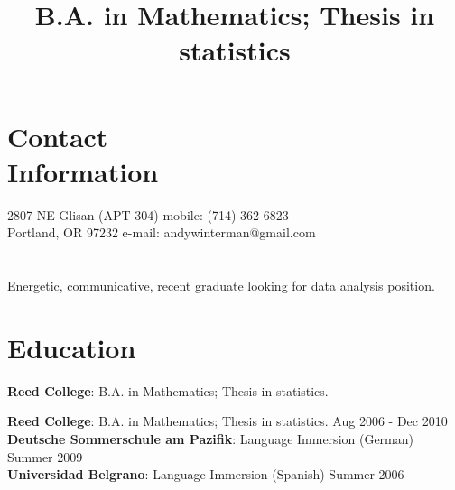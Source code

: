 \documentclass[margin,line]{resume}
\begin{document}
\begin{resume}

    \section{\mysidestyle Contact\\Information}


   2807 NE Glisan (APT 304)                    \hfill  mobile: (714) 362-6823          \vspace{0mm}\\\vspace{0mm}%
    Portland, OR 97232                         \hfill     e-mail: andywinterman@gmail.com      \vspace{0mm}\\%
  \vspace{-4.5mm}%

 \section{} Energetic, communicative, recent graduate looking for data analysis position.
    \section{\mysidestyle Education}
\begin{position}
    \title{B.A. in Mathematics; Thesis in statistics}
\textbf{Reed College}: B.A. in Mathematics; Thesis in statistics.
\end{position}
 
\textbf{Reed College}: B.A. in Mathematics; Thesis in statistics.
 \vspace{1mm} \hfill Aug 2006 - Dec 2010 \vspace{1mm}\\
\textbf{Deutsche Sommerschule am Pazifik}:  Language Immersion (German) \vspace{1mm} \hfill Summer 2009
\vspace{1mm} \\
\textbf{Universidad Belgrano}: Language Immersion (Spanish) \vspace{1mm} \hfill Summer 2006 \vspace{1mm}


\end{resume}
\end{document}
